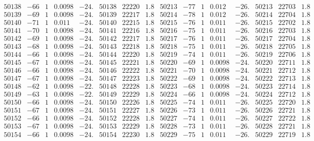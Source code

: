 \documentclass[11pt,reqno,a4letter]{article}
\numberwithin{figure}{section}
\numberwithin{table}{section}
\theoremstyle{plain}
\numberwithin{theorem}{section}
\theoremstyle{definition}
\begin{document}
\begin{table}[ht]
\begin{equation*}
{\begin{array}{ccccc|ccc||ccccc|ccc}
50138 & -66 & 1 & 0.0098 & -24. & 50138 & 22220 & 1.8 & 50213 & -77 & 1 & 0.012 & -26. & 50213 & 22703 & 1.8  \\
50139 & -69 & 1 & 0.0098 & -24. & 50139 & 22217 & 1.8 & 50214 & -78 & 1 & 0.012 & -26. & 50214 & 22704 & 1.8  \\
50140 & -71 & 1 & 0.011 & -24. & 50140 & 22215 & 1.8 & 50215 & -76 & 1 & 0.011 & -26. & 50215 & 22702 & 1.8  \\
50141 & -70 & 1 & 0.0098 & -24. & 50141 & 22216 & 1.8 & 50216 & -75 & 1 & 0.011 & -26. & 50216 & 22703 & 1.8  \\
50142 & -69 & 1 & 0.0098 & -24. & 50142 & 22217 & 1.8 & 50217 & -76 & 1 & 0.011 & -26. & 50217 & 22704 & 1.8  \\
50143 & -68 & 1 & 0.0098 & -24. & 50143 & 22218 & 1.8 & 50218 & -75 & 1 & 0.011 & -26. & 50218 & 22705 & 1.8  \\
50144 & -66 & 1 & 0.0098 & -24. & 50144 & 22220 & 1.8 & 50219 & -74 & 1 & 0.011 & -26. & 50219 & 22706 & 1.8  \\
50145 & -67 & 1 & 0.0098 & -24. & 50145 & 22221 & 1.8 & 50220 & -69 & 1 & 0.0098 & -24. & 50220 & 22711 & 1.8  \\
50146 & -66 & 1 & 0.0098 & -24. & 50146 & 22222 & 1.8 & 50221 & -70 & 1 & 0.0098 & -24. & 50221 & 22712 & 1.8  \\
50147 & -67 & 1 & 0.0098 & -24. & 50147 & 22223 & 1.8 & 50222 & -69 & 1 & 0.0098 & -24. & 50222 & 22713 & 1.8  \\
50148 & -62 & 1 & 0.0098 & -22. & 50148 & 22228 & 1.8 & 50223 & -68 & 1 & 0.0098 & -24. & 50223 & 22714 & 1.8  \\
50149 & -63 & 1 & 0.0098 & -22. & 50149 & 22229 & 1.8 & 50224 & -66 & 1 & 0.0098 & -24. & 50224 & 22712 & 1.8  \\
50150 & -66 & 1 & 0.0098 & -24. & 50150 & 22226 & 1.8 & 50225 & -74 & 1 & 0.011 & -26. & 50225 & 22720 & 1.8  \\
50151 & -67 & 1 & 0.0098 & -24. & 50151 & 22227 & 1.8 & 50226 & -73 & 1 & 0.011 & -26. & 50226 & 22721 & 1.8  \\
50152 & -66 & 1 & 0.0098 & -24. & 50152 & 22228 & 1.8 & 50227 & -74 & 1 & 0.011 & -26. & 50227 & 22722 & 1.8  \\
50153 & -67 & 1 & 0.0098 & -24. & 50153 & 22229 & 1.8 & 50228 & -73 & 1 & 0.011 & -26. & 50228 & 22721 & 1.8  \\
50154 & -66 & 1 & 0.0098 & -24. & 50154 & 22230 & 1.8 & 50229 & -75 & 1 & 0.011 & -26. & 50229 & 22719 & 1.8  \\

\end{array}}
\end{equation*}
\end{table}
\end{document}
